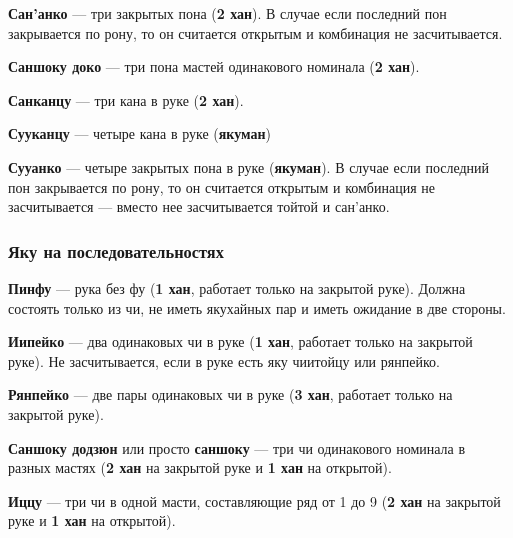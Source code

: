 \textbf{Сан'анко} --- три закрытых пона (\textbf{2 хан}). В случае если последний пон закрывается по рону, то он считается открытым и комбинация не засчитывается.

 \hfill {}

\textbf{Саншоку доко} --- три пона мастей одинакового номинала (\textbf{2 хан}).

 \hfill {}

\textbf{Санканцу} --- три кана в руке (\textbf{2 хан}).

 \hfill {}

\textbf{Сууканцу} --- четыре кана в руке (\textbf{якуман})

 \hfill {}

\textbf{Сууанко} --- четыре закрытых пона в руке (\textbf{якуман}). В случае если последний пон закрывается по рону, то он считается открытым и комбинация не засчитывается --- вместо нее засчитывается тойтой и сан'анко.


\subsubsection{Яку на последовательностях}

\textbf{Пинфу} --- рука без фу (\textbf{1 хан}, работает только на закрытой руке). Должна состоять только из чи, не иметь якухайных пар и иметь ожидание в две стороны.


\textbf{Иипейко} --- два одинаковых чи в руке (\textbf{1 хан}, работает только на закрытой руке). Не засчитывается, если в руке есть яку чиитойцу или рянпейко.


\textbf{Рянпейко} --- две пары одинаковых чи в руке (\textbf{3 хан}, работает только на закрытой руке).


\textbf{Саншоку додзюн} или просто \textbf{саншоку} --- три чи одинакового номинала в разных мастях (\textbf{2 хан} на закрытой руке и \textbf{1 хан} на открытой).

 \hfill {}

\textbf{Иццу} --- три чи в одной масти, составляющие ряд от 1 до 9 (\textbf{2 хан} на закрытой руке и \textbf{1 хан} на открытой).

